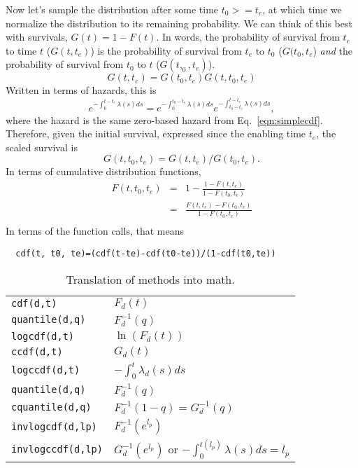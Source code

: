 \documentclass{article}
\newcommand{\code}[1]{\texttt{#1}}
\begin{document}
Now let's sample the distribution after some time $t_0>=t_e$, at which time
we normalize the distribution to its remaining probability. We can
think of this best with survivals, $G(t)=1-F(t)$. In words, the probability of
survival from $t_e$ to time $t$ ($G(t,t_e)$) is the probability
of survival from $t_e$ to $t_0$ ($G(t_0,t_e$)
\emph{and} the probability of survival from $t_0$ to $t$ ($G(t,_0,t_e)$).
\begin{equation}
  G(t,t_e)=G(t_0,t_e)G(t,t_0,t_e)
\end{equation}
Written in terms of hazards, this is
\begin{equation}
  e^{-\int_{0}^{t-t_e} \lambda(s)ds}=e^{-\int_{0}^{t_0-t_e} \lambda(s)ds}
    e^{-\int_{t_0-t_e}^{t-t_e} \lambda(s)ds},
\end{equation}
where the hazard is the same zero-based hazard from Eq.~\ref{eqn:simplecdf}.
Therefore, given the initial survival, expressed since the enabling time $t_e$,
the scaled survival is
\begin{equation}
  G(t,t_0,t_e)=G(t,t_e)/G(t_0,t_e).
\end{equation}
In terms of cumulative distribution functions,
\begin{eqnarray}
  F(t,t_0,t_e)&=&1-\frac{1-F(t,t_e)}{1-F(t_0,t_e)} \\
          &=&\frac{F(t,t_e)-F(t_0,t_e)}{1-F(t_0,t_e)}\label{eqn:shiftcum} \\
\end{eqnarray}
In terms of the function calls, that means
\begin{lstlisting}
  cdf(t, t0, te)=(cdf(t-te)-cdf(t0-te))/(1-cdf(t0,te))
\end{lstlisting}

\begin{table}
\begin{tabular}{ll} \hline
\code{cdf(d,t)} & $F_d(t)$ \\
\code{quantile(d,q)} & $F_d^{-1}(q)$ \\
\code{logcdf(d,t)} & $\ln(F_d(t))$ \\
\code{ccdf(d,t)} & $G_d(t)$ \\
\code{logccdf(d,t)} & $-\int_0^t \lambda_d(s)ds$ \\
\code{quantile(d,q)} & $F_d^{-1}(q)$ \\
\code{cquantile(d,q)} & $F_d^{-1}(1-q)=G_d^{-1}(q)$ \\
\code{invlogcdf(d,lp)} & $F_d^{-1}(e^{l_p})$ \\
\code{invlogccdf(d,lp)} & $G_d^{-1}(e^{l_p})$ or $-\int_0^{t(l_p)}\lambda(s)ds=l_p$ \\\hline
\end{tabular}
\caption{Translation of methods into math.\label{fig:methodmath}}
\end{table}
\end{document}
